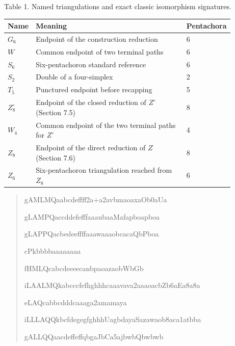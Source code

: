 \documentclass[11pt,letterpaper]{article}
\begin{document}
\noindent\begin{minipage}{\linewidth}
\begin{center}\small
Table 1. Named triangulations and exact classic isomorphism signatures.\par\smallskip
\begin{tabular}{p{0.08\linewidth}p{0.67\linewidth}p{0.13\linewidth}}
\toprule
\textbf{Name} & \textbf{Meaning} & \textbf{Pentachora} \\
\midrule
$G_6$ & Endpoint of the construction reduction & 6 \\
$W$ & Common endpoint of two terminal paths & 6 \\
$S_6$ & Six-pentachoron standard reference & 6 \\
$S_2$ & Double of a four-simplex & 2 \\
$T_5$ & Punctured endpoint before recapping & 5 \\
$Z^\circ_8$ & Endpoint of the closed reduction of $Z^\circ$ (Section 7.5) & 8 \\
$W_4$ & Common endpoint of the two terminal paths for $Z^\circ$ & 4 \\
$Z_8$ & Endpoint of the direct reduction of $Z$ (Section 7.6) & 8 \\
$Z_6$ & Six-pentachoron triangulation reached from $Z_8$ & 6 \\
\bottomrule
\end{tabular}
\end{center}
\begin{quote}\small
{}\quad \mbox{\small\ttfamily gAMLMQaabcdeffff2a+a2avbmaoaxaOb0aUa}\par
{}\quad \mbox{\small\ttfamily gLAMPQaccddefefffaaaubaaMafapboapboa}\par
{}\quad \mbox{\small\ttfamily gLAPPQacbedeeffffaaawaaaobcacaQbPboa}\par
{}\quad \mbox{\small\ttfamily cPkbbbbaaaaaaaa}\par
{}\quad \mbox{\small\ttfamily fHMLQcabcdeeeecanbpaoazaobWbGb}\par
{}\quad \mbox{\small\ttfamily iLAALMQkabcccfefhghhhcaaavava2aaaoacbZb6aEa8a8a}\par
{}\quad \mbox{\small\ttfamily eLAQcabbcdddcaaaga2amamaya}\par
{}\quad \mbox{\small\ttfamily iLLLAQQkbcfdegegfghhhUagbdayaSazawaob8aca1atbba}\par
{}\quad \mbox{\small\ttfamily gALLQQaacdeffeffqbgaJbCa5ajbwbQbwbwb}\par
\end{quote}
\end{minipage}\par\smallskip
\end{document}
